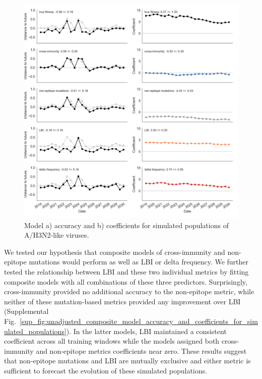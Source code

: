 \begin{figure}[t]
  \begin{center}
  \includegraphics[width=\textwidth]{figures/unadjusted-model-accuracy-and-coefficients-for-simulated-populations.png}
  \caption{Model a) accuracy and b) coefficients for simulated populations of A/H3N2-like viruses.}
  \label{fig:unadjusted_model_accuracy_and_coefficients_for_simulated_populations}
  \end{center}
\end{figure}

We tested our hypothesis that composite models of cross-immunity and non-epitope mutations would perform as well as LBI or delta frequency.
We further tested the relationship between LBI and these two individual metrics by fitting composite models with all combinations of these three predictors.
Surprisingly, cross-immunity provided no additional accuracy to the non-epitope metric, while neither of these mutation-based metrics provided any improvement over LBI (Supplemental Fig.~\ref{sup_fig:unadjusted_composite_model_accuracy_and_coefficients_for_simulated_populations}).
In the latter models, LBI maintained a consistent coefficient across all training windows while the models assigned both cross-immunity and non-epitope metrics coefficients near zero.
These results suggest that non-epitope mutations and LBI are mutually exclusive and either metric is sufficient to forecast the evolution of these simulated populations.

